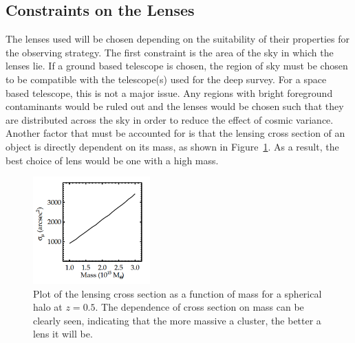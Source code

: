 	\subsection{Constraints on the Lenses} %
	\label{sub:constraints_on_the_lenses}
		The lenses used will be chosen depending on the suitability of their properties for the observing strategy. The first constraint is the area of the sky in which the lenses lie. If a ground based telescope is chosen, the region of sky must be chosen to be compatible with the telescope(s) used for the deep survey. For a space based telescope, this is not a major issue. Any regions with bright foreground contaminants would be ruled out and the lenses would be chosen such that they are distributed across the sky in order to reduce the effect of cosmic variance. Another factor that must be accounted for is that the lensing cross section of an object is directly dependent on its mass, as shown in Figure~\ref{fig:Lensing_cross_section_as_a_function_of_mass}\cite{Optimal_mass_configurations}. As a result, the best choice of lens would be one with a high mass.
		\begin{figure}[!htbp]
			\centering
				\includegraphics[width=0.4\textwidth]{../Images/Lensing_cross_section_as_a_function_of_mass.png}
			\caption[Lensing cross section as a function of mass]{\cite{Optimal_mass_configurations}Plot of the lensing cross section as a function of mass for a spherical halo at $z=0.5$. The dependence of cross section on mass can be clearly seen, indicating that the more massive a cluster, the better a lens it will be.\label{fig:Lensing_cross_section_as_a_function_of_mass}}
		\end{figure}


